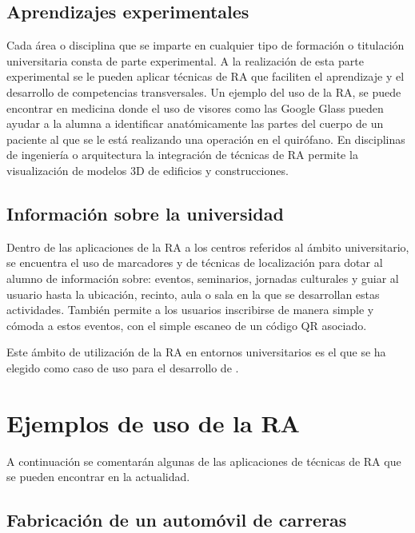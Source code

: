 \subsection{Aprendizajes experimentales} 

Cada área o disciplina que se imparte en cualquier tipo de formación o titulación universitaria consta de parte experimental. A la realización de esta parte experimental se le pueden aplicar técnicas de RA que faciliten el aprendizaje y el desarrollo de competencias transversales. Un ejemplo del uso de la RA, se puede encontrar en medicina donde el uso de visores como las Google Glass pueden ayudar a la alumna a identificar anatómicamente las partes del cuerpo de un paciente al que se le está realizando una operación en el quirófano. 
En disciplinas de ingeniería o arquitectura la integración de técnicas de RA permite la visualización de modelos 3D de edificios y construcciones.

\subsection{Información sobre la universidad}  

Dentro de las aplicaciones de la RA a los centros referidos al ámbito universitario, se encuentra el uso de marcadores y de técnicas de localización para dotar al alumno de información sobre: eventos, seminarios, jornadas culturales y guiar al usuario hasta la ubicación, recinto, aula o sala en la que se desarrollan estas actividades. También permite a los usuarios inscribirse de manera simple y cómoda a estos eventos, con el simple escaneo de un código QR asociado.

Este ámbito de utilización de la RA en entornos universitarios es el que se ha elegido como caso de uso para
el desarrollo de \ULLAR{}.

\section{Ejemplos de uso de la RA}

A continuación se comentarán algunas de las aplicaciones de técnicas de RA que se pueden encontrar en la actualidad.


\subsection{Fabricación de un automóvil de carreras} 

